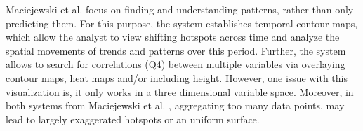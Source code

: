 \documentclass[electronic]{vgtc}             %
\begin{document}
Maciejewski et al. \cite{maciejewski:2010} focus on finding and understanding patterns, rather than only predicting them.
For this purpose, the system establishes temporal contour maps, which allow the analyst to view shifting hotspots across time and analyze the spatial movements of trends and patterns over this period.
Further, the system allows to search for correlations (Q4) between multiple variables via overlaying contour maps, heat maps and/or including height. 
However, one issue with this visualization is, it only works in a three dimensional variable space.
Moreover, in both systems from Maciejewski et al. \cite{maciejewski:2010, maciejewski:2011}, aggregating too many data points, may lead to largely exaggerated hotspots or an uniform surface. 
\end{document}

